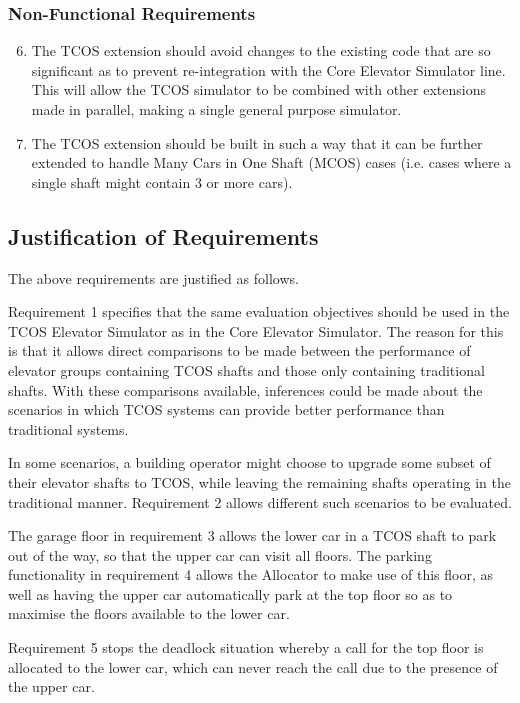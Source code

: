 \documentclass{UoYCSproject}
\begin{document}
\subsubsection{Non-Functional Requirements}

	\begin{enumerate}
	\setcounter{enumi}{5}
		\item The TCOS extension should avoid changes to the existing code that are so significant as to prevent re-integration with the Core Elevator Simulator line.  This will allow the TCOS simulator to be combined with other extensions made in parallel, making a single general purpose simulator.
		\item The TCOS extension should be built in such a way that it can be further extended to handle Many Cars in One Shaft (MCOS) cases (i.e. cases where a single shaft might contain 3 or more cars).
	\end{enumerate}

\subsection{Justification of Requirements}

The above requirements are justified as follows.

Requirement 1 specifies that the same evaluation objectives should be used in the TCOS Elevator Simulator as in the Core Elevator Simulator.  The reason for this is that it allows direct comparisons to be made between the performance of elevator groups containing TCOS shafts and those only containing traditional shafts.  With these comparisons available, inferences could be made about the scenarios in which TCOS systems can provide better performance than traditional systems.

In some scenarios, a building operator might choose to upgrade some subset of their elevator shafts to TCOS, while leaving the remaining shafts operating in the traditional manner.  Requirement 2 allows different such scenarios to be evaluated.

The garage floor in requirement 3 allows the lower car in a TCOS shaft to park out of the way, so that the upper car can visit all floors.  The parking functionality in requirement 4 allows the Allocator to make use of this floor, as well as having the upper car automatically park at the top floor so as to maximise the floors available to the lower car.

Requirement 5 stops the deadlock situation whereby a call for the top floor is allocated to the lower car, which can never reach the call due to the presence of the upper car.
\end{document}
